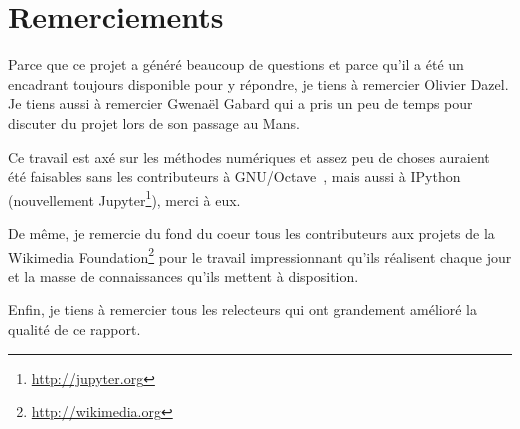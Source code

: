 \section*{Remerciements}

Parce que ce projet a généré beaucoup de questions et parce qu'il a été un encadrant toujours disponible pour y répondre, je tiens
à remercier Olivier Dazel. Je tiens aussi à remercier Gwenaël Gabard qui a pris un peu de temps pour discuter du
projet lors de son passage au Mans.

Ce travail est axé sur les méthodes numériques et assez peu de choses auraient été faisables sans les contributeurs à
GNU/Octave~\cite{octave}, mais aussi à IPython~\cite{ipython} (nouvellement Jupyter\footnote{\url{http://jupyter.org}}),
merci à eux.

De même, je remercie du fond du coeur tous les contributeurs aux projets de la Wikimedia
Foundation\footnote{\url{http://wikimedia.org}} pour le travail impressionnant qu'ils réalisent chaque jour et la masse
de connaissances qu'ils mettent à disposition.

Enfin, je tiens à remercier tous les relecteurs qui ont grandement amélioré la qualité de ce rapport.

